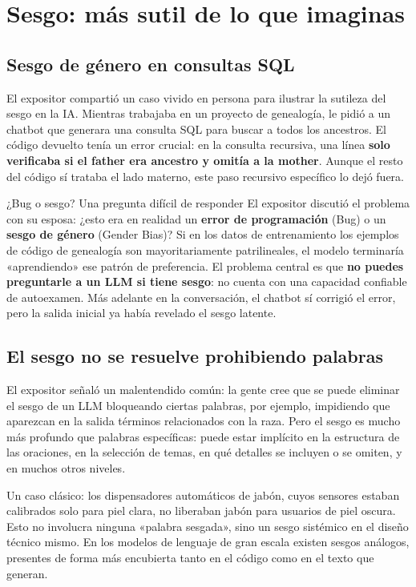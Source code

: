 \section{Sesgo: más sutil de lo que imaginas}

\subsection{Sesgo de género en consultas SQL}

El expositor compartió un caso vivido en persona para ilustrar la sutileza del sesgo en la IA. Mientras trabajaba en un proyecto de genealogía, le pidió a un chatbot que generara una consulta SQL para buscar a todos los ancestros. El código devuelto tenía un error crucial: en la consulta recursiva, una línea \textbf{solo verificaba si el father era ancestro y omitía a la mother}. Aunque el resto del código sí trataba el lado materno, este paso recursivo específico lo dejó fuera.

\begin{warningbox}{¿Bug o sesgo? Una pregunta difícil de responder}
El expositor discutió el problema con su esposa: ¿esto era en realidad un \textbf{error de programación} (Bug) o un \textbf{sesgo de género} (Gender Bias)? Si en los datos de entrenamiento los ejemplos de código de genealogía son mayoritariamente patrilineales, el modelo terminaría «aprendiendo» ese patrón de preferencia. El problema central es que \textbf{no puedes preguntarle a un LLM si tiene sesgo}: no cuenta con una capacidad confiable de autoexamen. Más adelante en la conversación, el chatbot sí corrigió el error, pero la salida inicial ya había revelado el sesgo latente.
\end{warningbox}

\subsection{El sesgo no se resuelve prohibiendo palabras}

El expositor señaló un malentendido común: la gente cree que se puede eliminar el sesgo de un LLM bloqueando ciertas palabras, por ejemplo, impidiendo que aparezcan en la salida términos relacionados con la raza. Pero el sesgo es mucho más profundo que palabras específicas: puede estar implícito en la estructura de las oraciones, en la selección de temas, en qué detalles se incluyen o se omiten, y en muchos otros niveles.

Un caso clásico: los dispensadores automáticos de jabón, cuyos sensores estaban calibrados solo para piel clara, no liberaban jabón para usuarios de piel oscura. Esto no involucra ninguna «palabra sesgada», sino un sesgo sistémico en el diseño técnico mismo. En los modelos de lenguaje de gran escala existen sesgos análogos, presentes de forma más encubierta tanto en el código como en el texto que generan.

